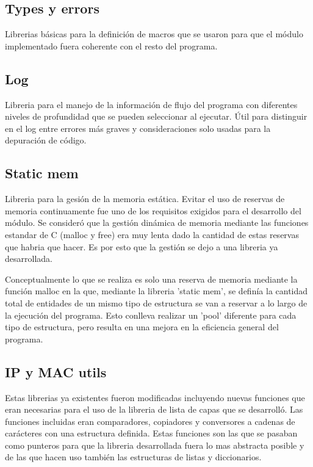 \documentclass[twoside, 12pt]{epstfg}
\begin{document}
\subsection{Types y errors}
Librerias básicas para la definición de macros que se usaron para que el módulo implementado fuera coherente con el resto del programa.
\subsection{Log} 
Libreria para el manejo de la información de flujo del programa con diferentes niveles de profundidad que se pueden seleccionar al ejecutar. Útil para distinguir en el log entre errores más graves y consideraciones solo usadas para la depuración de código.
\subsection{Static mem}
Libreria para la gesión de la memoria estática. Evitar el uso de reservas de memoria continuamente fue uno de los requisitos exigidos para el desarrollo del módulo. Se consideró que la gestión dinámica de memoria mediante las funciones estandar de C (malloc y free) era muy lenta dado la cantidad de estas reservas que habria que hacer. Es por esto que la gestión se dejo a una libreria ya desarrollada. 

Conceptualmente lo que se realiza es solo una reserva de memoria mediante la función malloc en la que, mediante la libreria 'static mem', se definía la cantidad total de entidades de un mismo tipo de estructura se van a reservar a lo largo de la ejecución del programa. Esto conlleva realizar un 'pool' diferente para cada tipo de estructura, pero resulta en una mejora en la eficiencia general del programa. 
\subsection{IP y MAC utils}
Estas librerias ya existentes fueron modificadas incluyendo nuevas funciones que eran necesarias para el uso de la libreria de lista de capas que se desarrolló. Las funciones incluidas eran comparadores, copiadores y conversores a cadenas de carácteres con una estructura definida. Estas funciones son las que se pasaban como punteros para que la libreria desarrollada fuera lo mas abstracta posible y de las que hacen uso también las estructuras de listas y diccionarios.
\end{document}
